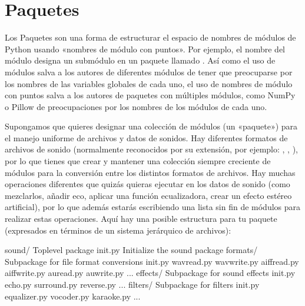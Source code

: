 \documentclass[a5paper,10pt,spanish]{sphinxmanual}
\begin{document}
\section{Paquetes}
\label{\detokenize{tutorial/modules:packages}}\label{\detokenize{tutorial/modules:tut-packages}}
\sphinxAtStartPar
Los Paquetes son una forma de estructurar el espacio de nombres de módulos de Python usando «nombres de módulo con puntos». Por ejemplo, el nombre del módulo  designa un submódulo  en un paquete llamado . Así como el uso de módulos salva a los autores de diferentes módulos de tener que preocuparse por los nombres de las variables globales de cada uno, el uso de nombres de módulo con puntos salva a los autores de paquetes con múltiples módulos, como NumPy o Pillow de preocupaciones por los nombres de los módulos de cada uno.

\sphinxAtStartPar
Supongamos que quieres designar una colección de módulos (un «paquete») para el manejo uniforme de archivos y datos de sonidos.  Hay diferentes formatos de archivos de sonido (normalmente reconocidos por su extensión, por ejemplo: , , ), por lo que tienes que crear y mantener una colección siempre creciente de módulos para la conversión entre los distintos formatos de archivos. Hay muchas operaciones diferentes que quizás quieras ejecutar en los datos de sonido (como mezclarlos, añadir eco, aplicar una función ecualizadora, crear un efecto estéreo artificial), por lo que además estarás escribiendo una lista sin fin de módulos para realizar estas operaciones.  Aquí hay una posible estructura para tu paquete (expresados en términos de un sistema jerárquico de archivos):

\begin{sphinxVerbatim}[commandchars=\\\{\}]
sound/                          Top\PYGZhy{}level package
      \PYGZus{}\PYGZus{}init\PYGZus{}\PYGZus{}.py               Initialize the sound package
      formats/                  Subpackage for file format conversions
              \PYGZus{}\PYGZus{}init\PYGZus{}\PYGZus{}.py
              wavread.py
              wavwrite.py
              aiffread.py
              aiffwrite.py
              auread.py
              auwrite.py
              ...
      effects/                  Subpackage for sound effects
              \PYGZus{}\PYGZus{}init\PYGZus{}\PYGZus{}.py
              echo.py
              surround.py
              reverse.py
              ...
      filters/                  Subpackage for filters
              \PYGZus{}\PYGZus{}init\PYGZus{}\PYGZus{}.py
              equalizer.py
              vocoder.py
              karaoke.py
              ...
\end{sphinxVerbatim}
\end{document}

